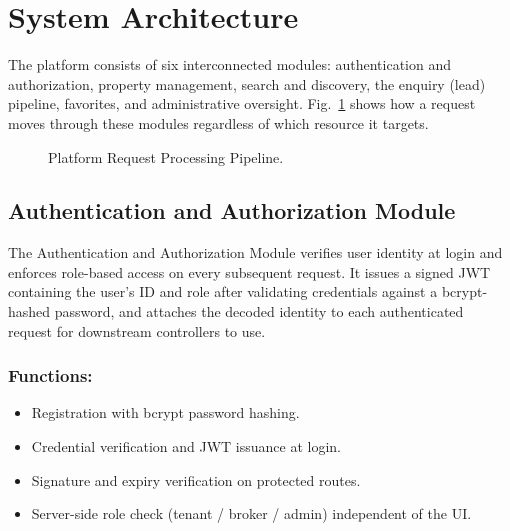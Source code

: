\documentclass[10pt,twocolumn]{article}
\begin{document}
\section{System Architecture}

The platform consists of six interconnected modules: authentication and authorization, property management, search and discovery, the enquiry (lead) pipeline, favorites, and administrative oversight. Fig.~\ref{fig:pipeline} shows how a request moves through these modules regardless of which resource it targets.

\begin{figure}[t]
\centering
{}
\caption{Platform Request Processing Pipeline.}
\label{fig:pipeline}
\end{figure}

\subsection{Authentication and Authorization Module}
The Authentication and Authorization Module verifies user identity at login and enforces role-based access on every subsequent request. It issues a signed JWT containing the user's ID and role after validating credentials against a bcrypt-hashed password, and attaches the decoded identity to each authenticated request for downstream controllers to use.
\subsubsection{Functions:}
\begin{itemize}
\item Registration with bcrypt password hashing.
\item Credential verification and JWT issuance at login.
\item Signature and expiry verification on protected routes.
\item Server-side role check (tenant / broker / admin) independent of the UI.
\end{itemize}
\end{document}

